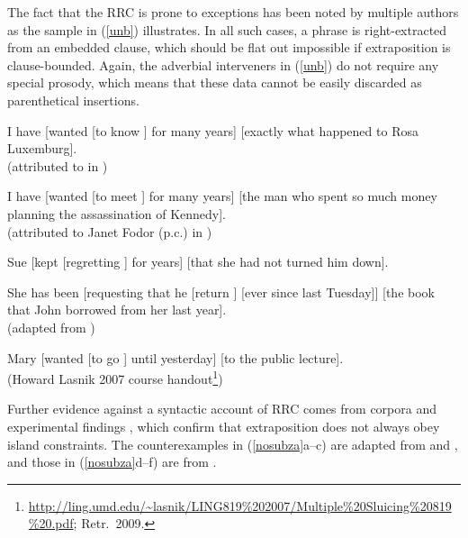 \documentclass[output=paper
 	        ,biblatex
                ,babelshorthands
                ,newtxmath
                ,draftmode
                ,colorlinks, citecolor=brown
]{langscibook}
\begin{document}
The fact that the RRC is prone to exceptions has been noted by multiple authors as the sample in 
 (\ref{unb}) illustrates. In all such cases, a phrase is right-extracted
 from an embedded clause, which should be flat out impossible if extraposition is clause-bounded. Again, the adverbial  interveners in (\ref{unb}) do not require any special prosody, which means that
  these data cannot be easily discarded as parenthetical insertions.
  
\eal \label{unb}
\ex I have  [wanted [to know \spc] for many years] [exactly what happened to Rosa Luxemburg].\\
(attributed to \citealt{
witten} in \citealt[92n]{postal74})

\ex I have  [wanted [to meet \spc] for many years] [the man who spent so much money planning the assassination of Kennedy].\\
(attributed to Janet Fodor (p.c.) in \citealt[177]{gazdar})

\ex Sue [kept [regretting \spc] for years] [that she had not turned
him down].\\
\citep{eynde96}

\ex She has been [requesting that he [return \spc] [ever since last Tuesday]] [the book
that John borrowed from her last year].\\
(adapted from \citealp[167]{Kayne98a-u})

\ex  Mary [wanted [to go \spc] until yesterday]  [to the public lecture].\\
(Howard Lasnik 2007 course handout\footnote{\url{http://ling.umd.edu/~lasnik/LING819\%202007/Multiple\%20Sluicing\%20819\%20.pdf}; Retr.\ 2009.})
\zl



Further evidence against a syntactic account of RRC comes from  corpora 
\citep{Mueller2004d,Mueller2007c} and experimental findings  \citep{SS2009a-u,strunk}, which confirm
 that  extraposition does  not always obey  island constraints.  The counterexamples in (\ref{nosubza}a--c) are adapted from
 \citet{SS2009a-u} and \citet{strunk}, and those in (\ref{nosubza}d--f) are from \citet[863]{chavesrnr}.



\eal \label{nosubza}


\end{document}
